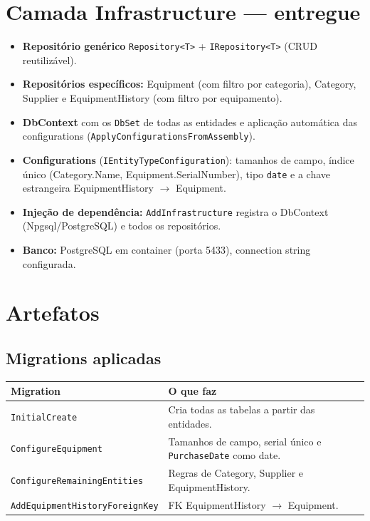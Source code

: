 \documentclass[11pt,a4paper]{article}
\newcommand{\headrow}[1]{\rowcolor{boxbg}#1}
\begin{document}
\section{Camada Infrastructure --- entregue}

\begin{itemize}[leftmargin=1.2em, itemsep=2pt]
  \item \textbf{Repositório genérico} \texttt{Repository<T>} + \texttt{IRepository<T>} (CRUD reutilizável).
  \item \textbf{Repositórios específicos:} Equipment (com filtro por categoria), Category,
        Supplier e EquipmentHistory (com filtro por equipamento).
  \item \textbf{DbContext} com os \texttt{DbSet} de todas as entidades e aplicação automática
        das configurations (\texttt{ApplyConfigurationsFromAssembly}).
  \item \textbf{Configurations} (\texttt{IEntityTypeConfiguration}): tamanhos de campo,
        índice único (Category.Name, Equipment.SerialNumber), tipo \texttt{date} e a
        chave estrangeira EquipmentHistory $\rightarrow$ Equipment.
  \item \textbf{Injeção de dependência:} \texttt{AddInfrastructure} registra o DbContext
        (Npgsql/PostgreSQL) e todos os repositórios.
  \item \textbf{Banco:} PostgreSQL em container (porta 5433), connection string configurada.
\end{itemize}

\section{Artefatos}

\subsection*{Migrations aplicadas}

\begin{tabularx}{\textwidth}{@{}l Y@{}}
\toprule
\headrow{\textbf{Migration} & \textbf{O que faz}} \\
\midrule
\texttt{InitialCreate} & Cria todas as tabelas a partir das entidades. \\
\texttt{ConfigureEquipment} & Tamanhos de campo, serial único e \texttt{PurchaseDate} como date. \\
\texttt{ConfigureRemainingEntities} & Regras de Category, Supplier e EquipmentHistory. \\
\texttt{AddEquipmentHistoryForeignKey} & FK EquipmentHistory $\rightarrow$ Equipment. \\
\bottomrule
\end{tabularx}
\end{document}
